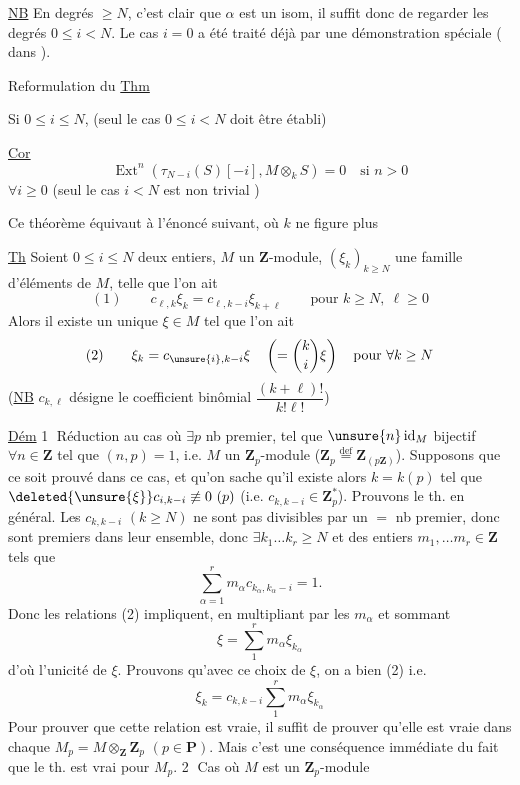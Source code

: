 \uline{NB} En degrés $\geq N$, c'est clair que $\alpha$ est un isom, il suffit donc de regarder les degrés $0\leq i<N$. Le cas $i=0$ a été traité déjà par une démonstration spéciale ( dans ).

Reformulation du \uline{Thm}

Si $0\leq i\leq N$, 
(seul le cas $0\leq i<N$ doit être établi)

\uline{Cor}
\[
\operatorname{Ext}^n(\tau_{N-i}(S)[-i],M\otimes_kS)=0\quad\text{si }n>0
\]
$\forall i\geq0$ (seul le cas $i<N$ est non trivial )

Ce théorème équivaut à l'énoncé suivant, où $k$ ne figure plus

\uline{Th} Soient $0\leq i\leq N$ deux entiers, $M$ un $\mathbf Z$-module, $(\xi_k)_{k\geq N}$ une famille d'éléments de $M$, telle que l'on ait
\[
(1)\qquad c_{\ell,k}\xi_k=c_{\ell,k-i}\xi_{k+\ell}\qquad\text{pour }k\geq N,\ \ell\geq0
\]
Alors il existe un unique $\xi\in M$ tel que l'on ait
\[
(2)\qquad\xi_k=c_{\unsure{i},k-i}\xi\quad\left(=\binom{k}{i}\xi\right)\quad\text{pour }\forall k\geq N
\]
(\uline{NB} $c_{k,\ell}$ désigne le coefficient binômial $\dfrac{(k+\ell)!}{k!\ell!}$)

\uline{Dém} \textcircled{1} Réduction au cas où $\exists p$ nb premier, tel que $\unsure{n}\operatorname{id}_M$ bijectif $\forall n\in\mathbf Z$ tel que $(n,p)=1$, i.e. $M$ un $\mathbf Z_p$-module ($\mathbf Z_p\overset{\mathrm{def}}=\mathbf Z_{(p\mathbf Z)}$).
Supposons que ce soit prouvé dans ce cas, et qu'on sache qu'il existe alors $k=k(p)$ tel que $\deleted{\unsure{\xi}}c_{i,k-i}\not\equiv0\ (p)$ (i.e. $c_{k,k-i}\in\mathbf Z_p^*$). Prouvons le th. en général. Les $c_{k,k-i}$ $(k\geq N)$ ne sont pas divisibles par un $=$ nb premier, donc sont premiers dans leur ensemble, donc $\exists k_1\ldots k_r\geq N$ et des entiers $m_1,\ldots m_r\in\mathbf Z$ tels que
\[
\sum_{\alpha=1}^{r}m_\alpha c_{k_\alpha,k_\alpha-i}=1.
\]
Donc les relations (2) impliquent, en multipliant par les $m_\alpha$ et sommant
\[
\xi=\sum_1^r m_\alpha\xi_{k_\alpha}
\]
d'où l'unicité de $\xi$. Prouvons qu'avec ce choix de $\xi$, on a bien (2) i.e.
\[
\xi_k=c_{k,k-i}\sum_1^r m_\alpha\xi_{k_\alpha}
\]
Pour prouver que cette relation est vraie,  il suffit de prouver qu'elle est vraie dans chaque $M_p=M\otimes_{\mathbf Z}\mathbf Z_p$ $(p\in\mathbf P)$. Mais c'est une conséquence immédiate du fait que le th. est vrai pour $M_p$.
\textcircled{2} Cas où $M$ est un $\mathbf Z_p$-module

